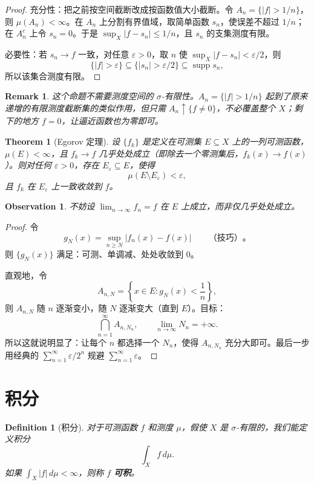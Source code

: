\documentclass[12pt,letterpaper,twoside,openright]{ctexbook}
\theoremstyle{bluehead}
\newtheorem{theorem}{Theorem}
\theoremstyle{olivehead}
\newtheorem{definition}{Definition}
\theoremstyle{orangehead}
\theoremstyle{redremark}
\newtheorem*{remark}{Remark}
\newtheorem*{observation}{Observation}
\begin{document}
\begin{proof}
充分性：把之前按空间截断改成按函数值大小截断。令 $A_n=\{|f|>1/n\}$，则 $\mu(A_n)<\infty$。在 $A_n$ 上分割有界值域，取简单函数 $s_n$，使误差不超过 $1/n$；在 $A_n^c$ 上令 $s_n=0$。于是 $\sup_X|f-s_n|\leq1/n$，且 $s_n$ 的支集测度有限。

必要性：若 $s_n\to f$ 一致，对任意 $\varepsilon>0$，取 $n$ 使 $\sup_X|f-s_n|<\varepsilon/2$，则
\[
\{|f|>\varepsilon\}\subseteq\{|s_n|>\varepsilon/2\}
\subseteq\operatorname{supp}s_n,
\]
所以该集合测度有限。
\end{proof}
\begin{remark}
这个命题不需要测度空间的 $\sigma$-有限性。$A_n=\{|f|>1/n\}$ 起到了原来递增的有限测度截断集的类似作用，但只需 $A_n\uparrow\{f\ne0\}$，不必覆盖整个 $X$；剩下的地方 $f=0$，让逼近函数也为零即可。
\end{remark}
\begin{theorem}[Egorov 定理]\label{thm:egorov-general}
设 $\{f_k\}$ 是定义在可测集 $E\subseteq X$ 上的一列可测函数，$\mu(E)<\infty$，且 $f_k\to f$ 几乎处处成立（即除去一个零测集后，$f_k(x)\to f(x)$）。则对任何 $\varepsilon>0$，存在 $E_\varepsilon\subseteq E$，使得
\[
  \mu(E\setminus E_\varepsilon)<\varepsilon,
\]
且 $f_k$ 在 $E_\varepsilon$ 上一致收敛到 $f$。
\end{theorem}
\begin{observation}
不妨设 $\lim_{n\to\infty}f_n=f$ 在 $E$ 上成立，而非仅几乎处处成立。
\end{observation}
\begin{proof}
令
\[
  g_N(x)=\sup_{n\geq N}|f_n(x)-f(x)|\qquad\text{（技巧）}。
\]
则 $\{g_N(x)\}$ 满足：可测、单调减、处处收敛到 $0$。

直观地，令
\[
  A_{n,N}=\left\{x\in E:g_N(x)<\frac1n\right\},
\]
则 $A_{n,N}$ 随 $n$ 逐渐变小，随 $N$ 逐渐变大（直到 $E$）。目标：
\[
  \bigcap_{n=1}^{\infty}A_{n,N_n},\qquad
  \lim_{n\to\infty}N_n=+\infty.
\]
所以这就说明显了：让每个 $n$ 都选择一个 $N_n$，使得 $A_{n,N_n}$ 充分大即可。最后一步用经典的 $\sum_{n=1}^{\infty}\varepsilon/2^n$ 规避 $\sum_{n=1}^{\infty}\varepsilon$。
\end{proof}
\section{积分}

\begin{definition}[积分]
对于可测函数 $f$ 和测度 $\mu$，假使 $X$ 是 $\sigma$-有限的，我们能定义积分
\[
  \int_X f\,d\mu.
\]
如果 $\int_X|f|\,d\mu<\infty$，则称 $f$ \textbf{可积}。
\end{definition}
\end{document}
